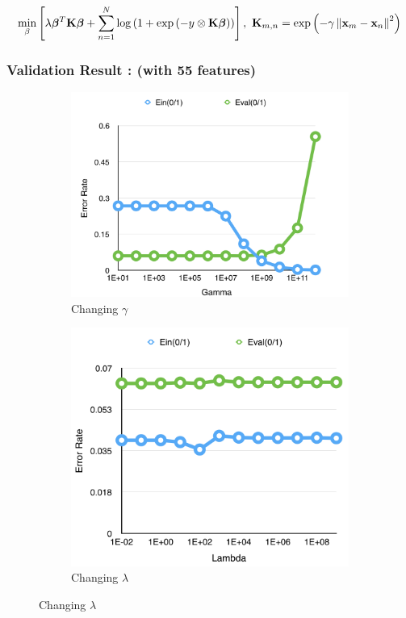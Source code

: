 \documentclass[12pt]{article}
\newcommand{\SBrackets}[1]{\left[#1\right]}
\newcommand{\ParTh}[1]{\left(#1\right)}
\newcommand{\BF}[1]{{\bf#1}}
\newcommand{\VecAbsVal}[1]{\left\|#1\right\|}
\begin{document}
\begin{align}
\min_{\beta}\SBrackets{\lambda\bm{\beta}^T\BF{K}\bm{\beta}+\sum_{n=1}^{N}\log\ParTh{1+\exp\ParTh{-y\otimes\BF{K}\bm{\beta}}}},~\BF{K}_{m,n}=\exp\ParTh{-\gamma\VecAbsVal{\BF{x}_m-\BF{x}_n}^2}
\end{align}

\subsubsection{Validation Result : (with 55 features)}

\begin{figure}[H]
	\centering
	\begin{subfigure}{.4\textwidth}
		\centering
		\includegraphics[width=1.0\linewidth]{KLR-3.png}
		\caption{Changing $\gamma$}
	\end{subfigure}
	\begin{subfigure}{.4\textwidth}
		\centering
		\includegraphics[width=1.0\linewidth]{KLR-4.png}
		\caption{Changing $\lambda$}
	\end{subfigure}
\end{figure}
\end{document}
